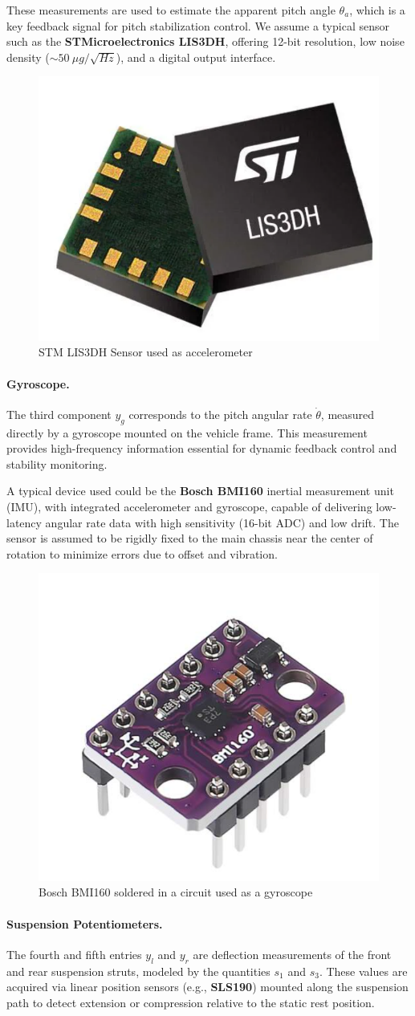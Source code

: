 \documentclass[]{report}
\begin{document}
	These measurements are used to estimate the apparent pitch angle $\theta_a$, which is a key feedback signal for pitch stabilization control. We assume a typical sensor such as the \textbf{STMicroelectronics LIS3DH}, offering 12-bit resolution, low noise density ($\sim50~\mu g/\sqrt{Hz}$), and a digital output interface.
	\begin{figure}[h]
		\centering
		\includegraphics[width=0.3\linewidth]{img/LIS3DH}
		\caption{STM LIS3DH Sensor used as accelerometer}
		\label{fig:lis3dh}
	\end{figure}
	
	
	\paragraph{Gyroscope.}
	The third component $y_g$ corresponds to the pitch angular rate $\dot{\theta}$, measured directly by a gyroscope mounted on the vehicle frame. This measurement provides high-frequency information essential for dynamic feedback control and stability monitoring.
	
	A typical device used could be the \textbf{Bosch BMI160} inertial measurement unit (IMU), with integrated accelerometer and gyroscope, capable of delivering low-latency angular rate data with high sensitivity (16-bit ADC) and low drift. The sensor is assumed to be rigidly fixed to the main chassis near the center of rotation to minimize errors due to offset and vibration. 
	\begin{figure}[h]
		\centering
		\includegraphics[width=0.3\linewidth]{img/LIS3DH1}
		\caption{Bosch  BMI160 soldered in a circuit used as a gyroscope}
		\label{fig:lis3dh1}
	\end{figure}
	
	
	\paragraph{Suspension Potentiometers.}
	The fourth and fifth entries $y_l$ and $y_r$ are deflection measurements of the front and rear suspension struts, modeled by the quantities $s_1$ and $s_3$. These values are acquired via linear position sensors (e.g., \textbf{SLS190}) mounted along the suspension path to detect extension or compression relative to the static rest position.
	
\end{document}
